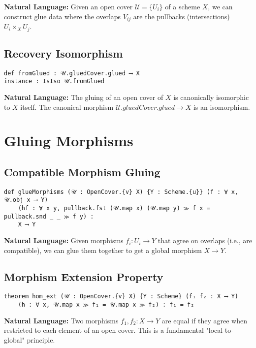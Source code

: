 \documentclass{article}
\theoremstyle{definition}
\begin{document}
\textbf{Natural Language:} Given an open cover $\mathcal{U} = \{U_i\}$ of a scheme $X$, we can construct glue data where the overlaps $V_{ij}$ are the pullbacks (intersections) $U_i \times_X U_j$.

\subsection{Recovery Isomorphism}

\begin{lstlisting}
def fromGlued : 𝒰.gluedCover.glued ⟶ X
instance : IsIso 𝒰.fromGlued
\end{lstlisting}

\textbf{Natural Language:} The gluing of an open cover of $X$ is canonically isomorphic to $X$ itself. The canonical morphism $\mathcal{U}.gluedCover.glued \to X$ is an isomorphism.

\section{Gluing Morphisms}

\subsection{Compatible Morphism Gluing}

\begin{lstlisting}
def glueMorphisms (𝒰 : OpenCover.{v} X) {Y : Scheme.{u}} (f : ∀ x, 𝒰.obj x ⟶ Y)
    (hf : ∀ x y, pullback.fst (𝒰.map x) (𝒰.map y) ≫ f x = pullback.snd _ _ ≫ f y) :
    X ⟶ Y
\end{lstlisting}

\textbf{Natural Language:} Given morphisms $f_i: U_i \to Y$ that agree on overlaps (i.e., are compatible), we can glue them together to get a global morphism $X \to Y$.

\subsection{Morphism Extension Property}

\begin{lstlisting}
theorem hom_ext (𝒰 : OpenCover.{v} X) {Y : Scheme} (f₁ f₂ : X ⟶ Y)
    (h : ∀ x, 𝒰.map x ≫ f₁ = 𝒰.map x ≫ f₂) : f₁ = f₂
\end{lstlisting}

\textbf{Natural Language:} Two morphisms $f_1, f_2: X \to Y$ are equal if they agree when restricted to each element of an open cover. This is a fundamental "local-to-global" principle.
\end{document}
